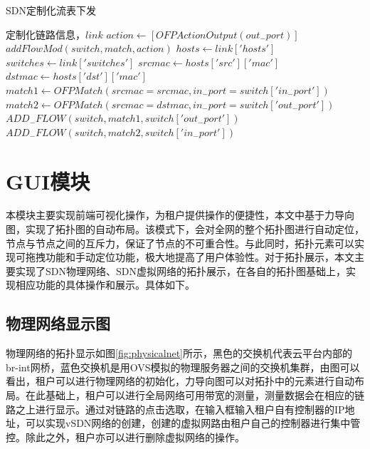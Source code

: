 \begin{algorithm}[!htb]
    \caption{SDN定制化流表下发}
    \label{code-6}
    \begin{algorithmic}[1] %
        \Require 定制化链路信息，$link$
        	\State $action \gets [OFPActionOutput(out_{-}port)]$
        	\State $addFlowMod(switch,match,action)$
        \EndFunction
        	\State $hosts \gets link['hosts']$
        	\State $switches \gets link['switches']$
        	\State $srcmac \gets hosts['src']['mac']$
        	\State $dstmac \gets hosts['dst']['mac']$
        		\State $match1 \gets OFPMatch(srcmac=srcmac,in_{-}port=switch['in_{-}port'])$
        		\State $match2 \gets OFPMatch(srcmac=dstmac,in_{-}port=switch['out_{-}port'])$
            	\State $ADD_{-}FLOW(switch,match1,switch['out_{-}port'])$
            	\State $ADD_{-}FLOW(switch,match2,switch['in_{-}port'])$
            \EndFor        	
        \EndFunction
    \end{algorithmic}
\end{algorithm}

\section{GUI模块}
本模块主要实现前端可视化操作，为租户提供操作的便捷性，本文中基于力导向图，实现了拓扑图的自动布局。该模式下，会对全网的整个拓扑图进行自动定位，节点与节点之间的互斥力，保证了节点的不可重合性。与此同时，拓扑元素可以实现可拖拽功能和手动定位功能，极大地提高了用户体验性。对于拓扑展示，本文主要实现了SDN物理网络、SDN虚拟网络的拓扑展示，在各自的拓扑图基础上，实现相应功能的具体操作和展示。具体如下。

\subsection{物理网络显示图}
物理网络的拓扑显示如图\ref{fig:physicalnet}所示，黑色的交换机代表云平台内部的br-int网桥，蓝色交换机是用OVS模拟的物理服务器之间的交换机集群，由图可以看出，租户可以进行物理网络的初始化，力导向图可以对拓扑中的元素进行自动布局。在此基础上，租户可以进行全局网络可用带宽的测量，测量数据会在相应的链路之上进行显示。通过对链路的点击选取，在输入框输入租户自有控制器的IP地址，可以实现vSDN网络的创建，创建的虚拟网路由租户自己的控制器进行集中管控。除此之外，租户亦可以进行删除虚拟网络的操作。

